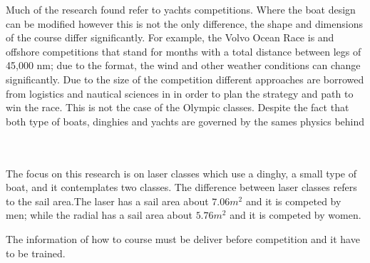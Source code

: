 




Much of the research found refer to yachts competitions. Where the boat design can be modified however this is not the only difference, the shape and dimensions of the course differ significantly. For example, the Volvo Ocean Race is and offshore competitions that stand for months with a total distance between legs of 45,000 nm; due to the format, the wind and other weather conditions can change significantly.  Due to the size of the competition different approaches are borrowed from logistics and nautical sciences in in order to plan the strategy and path to win the race. This is not the case of the Olympic classes. Despite the fact that both type of boats, dinghies and yachts are governed by the sames physics behind 







\\ 
\\
The focus on this research is on laser classes which use a dinghy, a small type of boat, and it contemplates two classes.  %
The difference between laser classes refers to the sail area.The laser has a sail area about $7.06 m^2$  and it is competed by men; while the radial has a sail area about  $5.76 m^2$ and it is competed by women.








 The information of how to course must be deliver before competition and it have to be trained.





